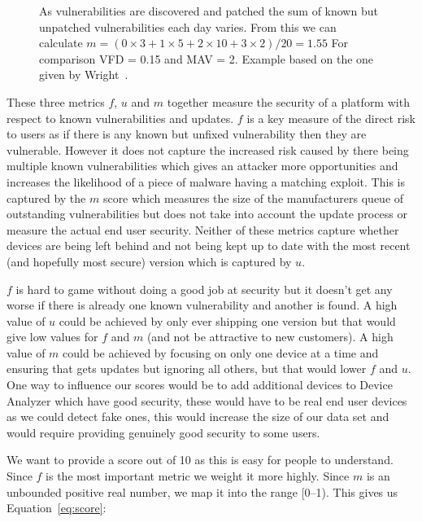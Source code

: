 \begin{figure}
\centering

\caption{As vulnerabilities are discovered and patched the sum of known but unpatched vulnerabilities each day varies. From this we can calculate $m = (0 \times 3 + 1 \times 5 + 2 \times 10 + 3 \times 2) / 20 = 1.55$ For comparison VFD = 0.15 and MAV = 2. Example based on the one given by Wright~\cite{Wright2014}.}
\label{fig:mcalculation}
\end{figure}

These three metrics $f$, $u$ and $m$ together measure the security of a platform with respect to known vulnerabilities and updates.
$f$ is a key measure of the direct risk to users as if there is any known but unfixed vulnerability then they are vulnerable.
However it does not capture the increased risk caused by there being multiple known vulnerabilities which gives an attacker more opportunities and increases the likelihood of a piece of malware having a matching exploit.
This is captured by the $m$ score which measures the size of the manufacturers queue of outstanding vulnerabilities but does not take into account the update process or measure the actual end user security.
Neither of these metrics capture whether devices are being left behind and not being kept up to date with the most recent (and hopefully most secure) version which is captured by $u$.

$f$ is hard to game without doing a good job at security but it doesn't get any worse if there is already one known vulnerability and another is found.
A high value of $u$ could be achieved by only ever shipping one version but that would give low values for $f$ and $m$ (and not be attractive to new customers).
A high value of $m$ could be achieved by focusing on only one device at a time and ensuring that gets updates but ignoring all others, but that would lower $f$ and $u$.
One way to influence our scores would be to add additional devices to Device Analyzer which have good security, these would have to be real end user devices as we could detect fake ones, this would increase the size of our data set and would require providing genuinely good security to some users.

We want to provide a score out of 10 as this is easy for people to understand.
Since $f$ is the most important metric we weight it more highly.
Since $m$ is an unbounded positive real number, we map it into the range [0--1).
This gives us Equation~\ref{eq:score}:

